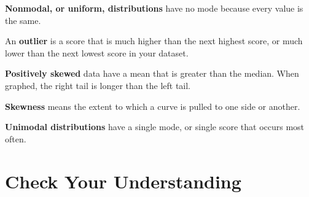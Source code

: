 \documentclass[
  letterpaper,
  DIV=11,
  numbers=noendperiod]{scrreprt}
\begin{document}
\textbf{Nonmodal, or uniform, distributions} have no mode because every
value is the same.

An \textbf{outlier} is a score that is much higher than the next highest
score, or much lower than the next lowest score in your dataset.

\textbf{Positively skewed} data have a mean that is greater than the
median. When graphed, the right tail is longer than the left tail.

\textbf{Skewness} means the extent to which a curve is pulled to one
side or another.

\textbf{Unimodal distributions} have a single mode, or single score that
occurs most often.

\section*{Check Your Understanding}\label{check-your-understanding-1}

\end{document}
